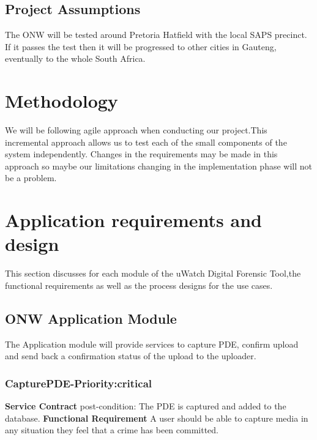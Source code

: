 \documentclass[a4paper,12pt]{article}
\begin{document}
\subsection{Project Assumptions}
The ONW will be tested around Pretoria Hatfield with the local SAPS precinct. If it passes the test then it will be progressed to other cities in Gauteng, eventually to the whole South Africa. 

\section{Methodology}
We will be following agile approach when conducting our project.This incremental approach allows us to test each of the small components of the system independently.
Changes in the requirements may be made in this approach so maybe our limitations changing in the implementation phase will not be a problem.
 

\section{Application requirements and design}
This section discusses for each module of the uWatch Digital Forensic Tool,the functional requirements
as well as the process designs for the use cases.
\subsection{ONW Application Module}
The Application module will provide services to capture PDE, confirm upload and send back a confirmation status of the upload to the uploader.
\subsubsection{CapturePDE-Priority:critical}
\textbf{Service Contract}\newline
post-condition: The PDE is captured and added to the database.\newline
\textbf{Functional Requirement}\newline
A user should be able to capture media in any situation they feel that a crime has been committed.	\newline
\end{document}
